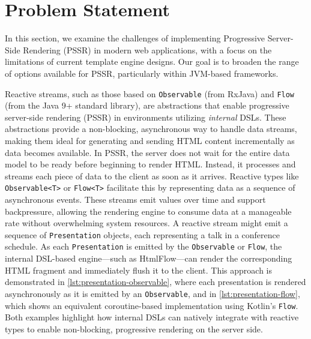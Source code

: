 \section{Problem Statement}

In this section, we examine the challenges of implementing Progressive
Server-Side Rendering (PSSR) in modern web applications, with a focus on the
limitations of current template engine designs. Our goal is to broaden the
range of options available for PSSR, particularly within JVM-based frameworks.

Reactive streams, such as those based on \texttt{Observable} (from RxJava) and
\texttt{Flow} (from the Java 9+ standard library), are abstractions that enable
progressive server-side rendering (PSSR) in environments utilizing
\textit{internal} DSLs. These abstractions provide a non-blocking, asynchronous
way to handle data streams, making them ideal for generating and sending HTML
content incrementally as data becomes available. In PSSR, the server does not
wait for the entire data model to be ready before beginning to render HTML.
Instead, it processes and streams each piece of data to the client as soon as
it arrives. Reactive types like \texttt{Observable<T>} or \texttt{Flow<T>}
facilitate this by representing data as a sequence of asynchronous events.
These streams emit values over time and support backpressure, allowing the
rendering engine to consume data at a manageable rate without overwhelming
system resources. A reactive stream might emit a sequence of
\texttt{Presentation} objects, each representing a talk in a conference
schedule. As each \texttt{Presentation} is emitted by the \texttt{Observable}
or \texttt{Flow}, the internal DSL-based engine—such as HtmlFlow—can render the
corresponding HTML fragment and immediately flush it to the client. This
approach is demonstrated in \autoref{lst:presentation-observable}, where each
presentation is rendered asynchronously as it is emitted by an
\texttt{Observable}, and in \autoref{lst:presentation-flow}, which shows an
equivalent coroutine-based implementation using Kotlin's \texttt{Flow}. Both
examples highlight how internal DSLs can natively integrate with reactive types
to enable non-blocking, progressive rendering on the server side.

